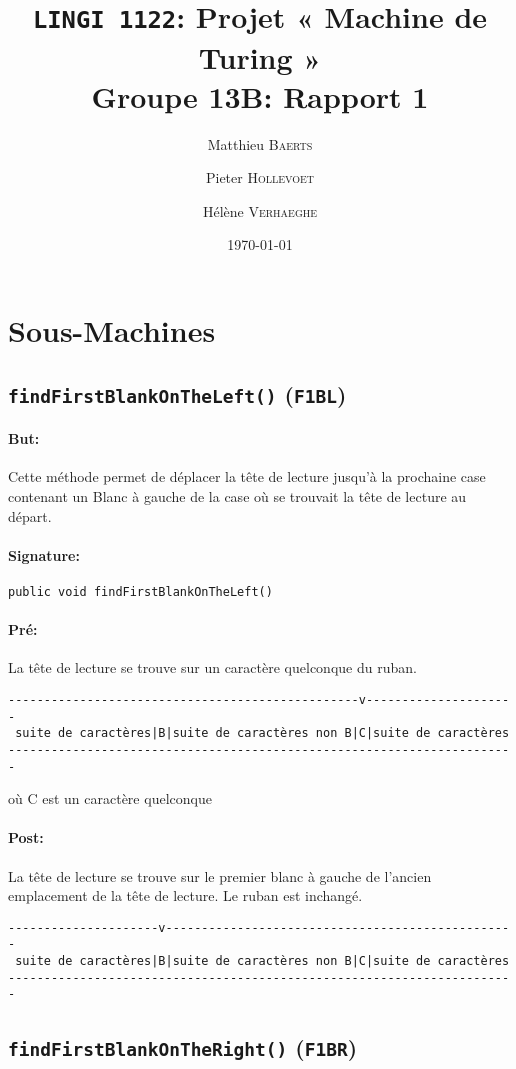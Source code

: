 \documentclass[a4paper,11pt]{article}
\title{\texttt{LINGI 1122}: Projet « Machine de Turing » \\ {\large Groupe 13B: Rapport 1}}
\author{Matthieu \textsc{Baerts} \and Pieter \textsc{Hollevoet} \and Hélène \textsc{Verhaeghe}}
\date{\today}
\begin{document}
\maketitle
\section{Sous-Machines}
\subsection{\texttt{findFirstBlankOnTheLeft()} (\texttt{F1BL})}
\paragraph{But:} Cette méthode permet de déplacer la t\^ete de lecture jusqu'à la prochaine case contenant un Blanc à gauche de la case où se trouvait la tête de lecture au départ.
\paragraph{Signature:} \texttt{public void findFirstBlankOnTheLeft()}
\paragraph{Pré:} La tête de lecture se trouve sur un caractère quelconque du ruban.
\begin{verbatim}
-------------------------------------------------v---------------------
 suite de caractères|B|suite de caractères non B|C|suite de caractères
-----------------------------------------------------------------------
\end{verbatim}
où C est un caractère quelconque
\paragraph{Post:} La tête de lecture se trouve sur le premier blanc à gauche de l'ancien emplacement de la tête de lecture. Le ruban est inchangé.
\begin{verbatim}
---------------------v-------------------------------------------------
 suite de caractères|B|suite de caractères non B|C|suite de caractères
-----------------------------------------------------------------------
\end{verbatim}
\subsection{\texttt{findFirstBlankOnTheRight()} (\texttt{F1BR})}
\end{document}
